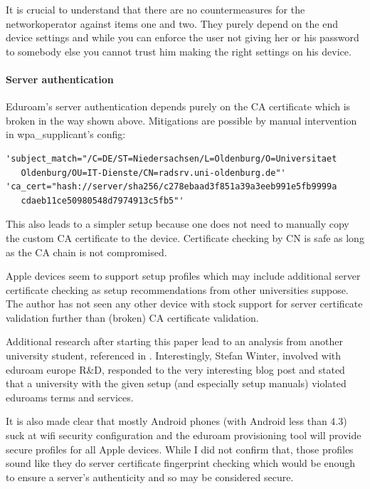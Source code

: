 \documentclass[12pt,a4paper]{scrartcl}
\begin{document}
It is crucial to understand that there are no countermeasures for the networkoperator against items one and two.
They purely depend on the end device settings and while you can enforce the user not giving her or his password to somebody else you cannot trust him making the right settings on his device.

\paragraph {Server authentication}
Eduroam's server authentication depends purely on the CA certificate which is broken in the way shown above.
Mitigations are possible by manual intervention in wpa\_supplicant's config:
\begin{verbatim}
'subject_match="/C=DE/ST=Niedersachsen/L=Oldenburg/O=Universitaet
   Oldenburg/OU=IT-Dienste/CN=radsrv.uni-oldenburg.de"'
'ca_cert="hash://server/sha256/c278ebaad3f851a39a3eeb991e5fb9999a
   cdaeb11ce50980548d7974913c5fb5"'
\end{verbatim}

This also leads to a simpler setup because one does not need to manually copy the custom CA certificate to the device.
Certificate checking by CN is safe as long as the CA chain is not compromised.

Apple devices seem to support setup profiles which may include additional server certificate checking as setup recommendations from other universities suppose.
The author has not seen any other device with stock support for server certificate validation further than (broken) CA certificate validation.

Additional research after starting this paper lead to an analysis from another university student, referenced in \cite{h4des}.
Interestingly, Stefan Winter, involved with eduroam europe R\&D, responded to the very interesting blog post and stated that a university with the given setup (and especially setup manuals) violated eduroams terms and services.

It is also made clear that mostly Android phones (with Android less than 4.3) suck at wifi security configuration and the eduroam provisioning tool will provide secure profiles for all Apple devices.
While I did not confirm that, those profiles sound like they do server certificate fingerprint checking which would be enough to ensure a server's authenticity and so may be considered secure.
\end{document}
